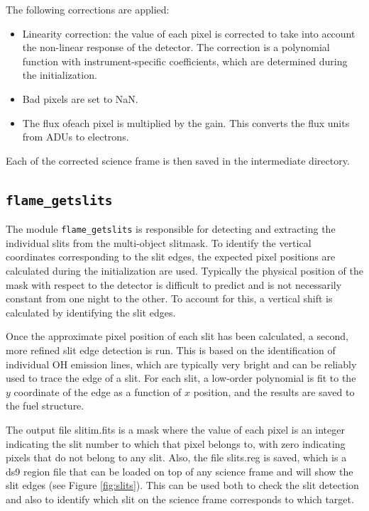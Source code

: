 \documentclass[a4paper, notitlepage]{article}
\begin{document}
The following corrections are applied:
\begin{itemize}
\item Linearity correction: the value of each pixel is corrected to take into account the non-linear response of the detector. The correction is a polynomial function with instrument-specific coefficients, which are determined during the initialization.
\item Bad pixels are set to NaN.
\item The flux ofeach pixel is multiplied by the gain. This converts the flux units from ADUs to electrons.
\end{itemize}

Each of the corrected science frame is then saved in the intermediate directory.


\subsection{\texttt{flame\_getslits}}

The module \texttt{flame\_getslits} is responsible for detecting and extracting the individual slits from the multi-object slitmask. To identify the vertical coordinates corresponding to the slit edges, the expected pixel positions are calculated during the initialization are used. Typically the physical position of the mask with respect to the detector is difficult to predict and is not necessarily constant from one night to the other. To account for this, a vertical shift is calculated by identifying the slit edges.

Once the approximate pixel position of each slit has been calculated, a second, more refined slit edge detection is run. This is based on the identification of individual OH emission lines, which are typically very bright and can be reliably used to trace the edge of a slit. For each slit, a low-order polynomial is fit to the $y$ coordinate of the edge as a function of $x$ position, and the results are saved to the fuel structure.

The output file slitim.fits is a mask where the value of each pixel is an integer indicating the slit number to which that pixel belongs to, with zero indicating pixels that do not belong to any slit. Also, the file slits.reg is saved, which is a ds9 region file that can be loaded on top of any science frame and will show the slit edges (see Figure \ref{fig:slits}). This can be used both to check the slit detection and also to identify which slit on the science frame corresponds to which target.
\end{document}
